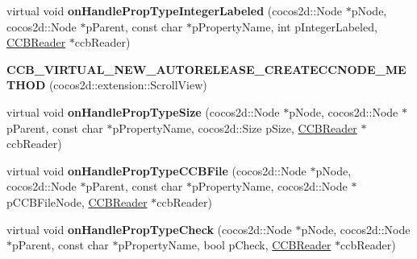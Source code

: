 \begin{DoxyCompactItemize}
\item 
\mbox{\label{classcocosbuilder_1_1ScrollViewLoader_abed10588b13935af1e04653a825711ba}} 
virtual void {\bfseries on\+Handle\+Prop\+Type\+Integer\+Labeled} (cocos2d\+::\+Node $\ast$p\+Node, cocos2d\+::\+Node $\ast$p\+Parent, const char $\ast$p\+Property\+Name, int p\+Integer\+Labeled, \hyperlink{classcocosbuilder_1_1CCBReader}{C\+C\+B\+Reader} $\ast$ccb\+Reader)
\item 
\mbox{\label{classcocosbuilder_1_1ScrollViewLoader_a0435cffb1c7b5dc42b8aff18565255c0}} 
{\bfseries C\+C\+B\+\_\+\+V\+I\+R\+T\+U\+A\+L\+\_\+\+N\+E\+W\+\_\+\+A\+U\+T\+O\+R\+E\+L\+E\+A\+S\+E\+\_\+\+C\+R\+E\+A\+T\+E\+C\+C\+N\+O\+D\+E\+\_\+\+M\+E\+T\+H\+OD} (cocos2d\+::extension\+::\+Scroll\+View)
\item 
\mbox{\label{classcocosbuilder_1_1ScrollViewLoader_a45851c4dde07271b6696dea8fb032778}} 
virtual void {\bfseries on\+Handle\+Prop\+Type\+Size} (cocos2d\+::\+Node $\ast$p\+Node, cocos2d\+::\+Node $\ast$p\+Parent, const char $\ast$p\+Property\+Name, cocos2d\+::\+Size p\+Size, \hyperlink{classcocosbuilder_1_1CCBReader}{C\+C\+B\+Reader} $\ast$ccb\+Reader)
\item 
\mbox{\label{classcocosbuilder_1_1ScrollViewLoader_af5863b95da98819ad89622ceb974e3c6}} 
virtual void {\bfseries on\+Handle\+Prop\+Type\+C\+C\+B\+File} (cocos2d\+::\+Node $\ast$p\+Node, cocos2d\+::\+Node $\ast$p\+Parent, const char $\ast$p\+Property\+Name, cocos2d\+::\+Node $\ast$p\+C\+C\+B\+File\+Node, \hyperlink{classcocosbuilder_1_1CCBReader}{C\+C\+B\+Reader} $\ast$ccb\+Reader)
\item 
\mbox{\label{classcocosbuilder_1_1ScrollViewLoader_ad075d21e5ec0c20047898f523f29c121}} 
virtual void {\bfseries on\+Handle\+Prop\+Type\+Check} (cocos2d\+::\+Node $\ast$p\+Node, cocos2d\+::\+Node $\ast$p\+Parent, const char $\ast$p\+Property\+Name, bool p\+Check, \hyperlink{classcocosbuilder_1_1CCBReader}{C\+C\+B\+Reader} $\ast$ccb\+Reader)
\item 
\mbox{\label{classcocosbuilder_1_1ScrollViewLoader_a8fa8be9b190292651dbaf2b509a00e6a}} 

\end{DoxyCompactItemize}
